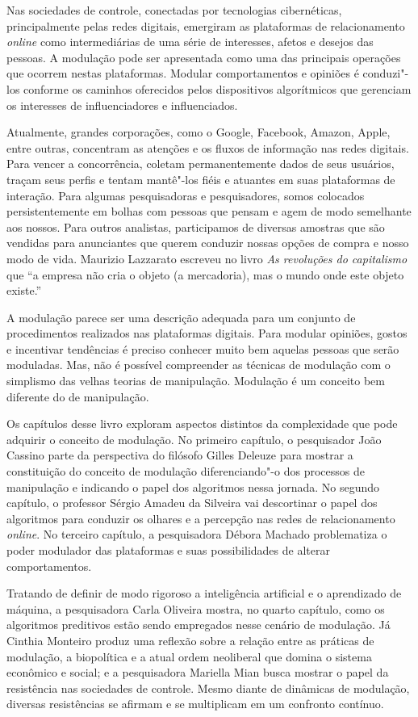 Nas sociedades de controle, conectadas por tecnologias cibernéticas,
principalmente pelas redes digitais, emergiram as plataformas de
relacionamento \emph{online} como intermediárias de uma série de interesses,
afetos e desejos das pessoas. A modulação pode ser apresentada como uma
das principais operações que ocorrem nestas plataformas. Modular
comportamentos e opiniões é conduzi"-los conforme os caminhos oferecidos
pelos dispositivos algorítmicos que gerenciam os interesses de
influenciadores e influenciados.

Atualmente, grandes corporações, como o Google, Facebook, Amazon,
Apple, entre outras, concentram as atenções e os fluxos de informação
nas redes digitais. Para vencer a concorrência, coletam permanentemente
dados de seus usuários, traçam seus perfis e tentam mantê"-los fiéis e
atuantes em suas plataformas de interação. Para algumas pesquisadoras e pesquisadores,
somos colocados persistentemente em bolhas com pessoas que
pensam e agem de modo semelhante aos nossos. Para outros analistas, participamos de
diversas amostras que são vendidas para anunciantes que querem conduzir
nossas opções de compra e nosso modo de vida. Maurizio Lazzarato
escreveu no livro \emph{As revoluções do capitalismo} que ``a
empresa não cria o objeto (a mercadoria), mas o mundo onde este objeto existe.''

A modulação parece ser uma descrição adequada para um conjunto de
procedimentos realizados nas plataformas digitais. Para modular
opiniões, gostos e incentivar tendências é preciso conhecer muito bem
aquelas pessoas que serão moduladas. Mas, não é possível compreender as
técnicas de modulação com o simplismo das velhas teorias de manipulação.
Modulação é um conceito bem diferente do de manipulação.

Os capítulos desse livro exploram aspectos distintos da complexidade que
pode adquirir o conceito de modulação. No primeiro capítulo, o
pesquisador João Cassino parte da perspectiva do filósofo Gilles Deleuze
para mostrar a constituição do conceito de modulação diferenciando"-o dos
processos de manipulação e indicando o papel dos algoritmos nessa
jornada. No segundo capítulo, o professor Sérgio Amadeu da Silveira vai
descortinar o papel dos algoritmos para conduzir os olhares e a
percepção nas redes de relacionamento \emph{online}. No terceiro
capítulo, a pesquisadora Débora Machado problematiza o poder modulador
das plataformas e suas possibilidades de alterar comportamentos.

Tratando de definir de modo rigoroso a inteligência artificial e o
aprendizado de máquina, a pesquisadora Carla Oliveira mostra, no quarto 
capítulo, como os algoritmos preditivos estão sendo empregados nesse
cenário de modulação. Já Cinthia Monteiro produz uma
reflexão sobre a relação entre as práticas de modulação, a biopolítica e
a atual ordem neoliberal que domina o sistema econômico e social; e a pesquisadora Mariella Mian busca mostrar o papel da
resistência nas sociedades de controle. Mesmo diante de dinâmicas de
modulação, diversas resistências se afirmam e se multiplicam em um
confronto contínuo.

